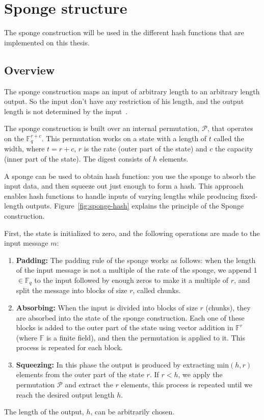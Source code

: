 \section{Sponge structure}
\label{sec:sponge-construction}
The sponge construction will be used in the different hash functions that are implemented on this thesis.

\subsection*{Overview}
The sponge construction maps an input of arbitrary length to an arbitrary length output. So the input don't have any restriction of his length, and the output length is not determined by the input~\cite{guido2011cryptographic}.

The sponge construction is built over an internal permutation, $\mathcal{P}$, that operates on the $\mathbb{F}_q^{r+c}$. This permutation works on a state with a length of $t$ called the width, where $t=r+c$, $r$ is the rate (outer part of the state) and $c$ the capacity (inner part of the state). The digest consists of $h$ elements.

A sponge can be used to obtain hash function: you use the sponge to absorb the input data, and then squeeze out just enough to form a hash. This approach enables hash functions to handle inputs of varying lengths while producing fixed-length outputs.
Figure~\ref{fig:sponge-hash} explains the principle of the Sponge construction.

First, the state is initialized to zero, and the following operations are made to the input message $m$:
\begin{enumerate}
    \item \textbf{Padding:} The padding rule of the sponge works as follows: when the length of the input message is not a multiple of the rate of the sponge, we append 1$\in\mathbb{F}_q$ to the input followed by enough zeros to make it a multiple of $r$, and split the message into blocks of size $r$, called chunks.
    \item \textbf{Absorbing:} When the input is divided into blocks of size $r$ (chunks), they are absorbed into the state of the sponge construction. Each one of these blocks is added to the outer part of the state using vector addition in $\mathbb{F}^r$ (where $\mathbb{F}$ is a finite field), and then the permutation is applied to it. This process is repeated for each block.
    \item \textbf{Squeezing:} In this phase the output is produced by extracting min$\left(h,r\right)$ elements from the outer part of the state $r$. If $r<h$, we apply the permutation $\mathcal{P}$ and extract the $r$ elements, this process is repeated until we reach the desired output length $h$.
\end{enumerate}
The length of the output, $h$, can be arbitrarily chosen.

